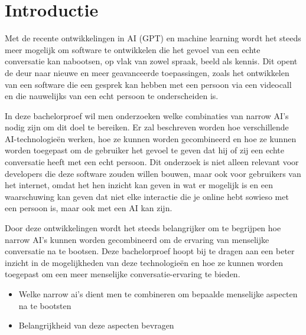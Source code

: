 
\section{Introductie} %
\label{sec:introductie}

Met de recente ontwikkelingen in AI (GPT) en machine learning wordt het steeds meer mogelijk om software te ontwikkelen die het gevoel van een echte conversatie kan nabootsen, op vlak van zowel spraak, beeld als kennis. Dit opent de deur naar nieuwe en meer geavanceerde toepassingen, zoals het ontwikkelen van een software die een gesprek kan hebben met een persoon via een videocall en die nauwelijks van een echt persoon te onderscheiden is.

In deze bachelorproef wil men onderzoeken welke combinaties van narrow AI's nodig zijn om dit doel te bereiken. Er zal beschreven worden hoe verschillende AI-technologieën werken, hoe ze kunnen worden gecombineerd en hoe ze kunnen worden toegepast om de gebruiker het gevoel te geven dat hij of zij een echte conversatie heeft met een echt persoon. Dit onderzoek is niet alleen relevant voor developers die deze software zouden willen bouwen, maar ook voor gebruikers van het internet, omdat het hen inzicht kan geven in wat er mogelijk is en een waarschuwing kan geven dat niet elke interactie die je online hebt sowieso met een persoon is, maar ook met een AI kan zijn.

Door deze ontwikkelingen wordt het steeds belangrijker om te begrijpen hoe narrow AI's kunnen worden gecombineerd om de ervaring van menselijke conversatie na te bootsen. Deze bachelorproef hoopt bij te dragen aan een beter inzicht in de mogelijkheden van deze technologieën en hoe ze kunnen worden toegepast om een meer menselijke conversatie-ervaring te bieden.

\begin{itemize}
    \item Welke narrow ai's dient men te combineren om bepaalde menselijke aspecten na te bootsten
    \item Belangrijkheid van deze aspecten bevragen
\end{itemize}


